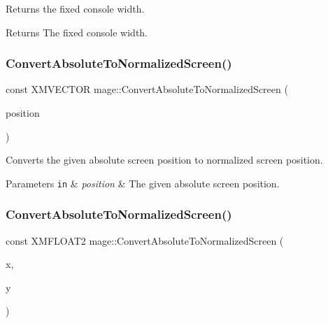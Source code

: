 Returns the fixed console width.

\begin{DoxyReturn}{Returns}
The fixed console width. 
\end{DoxyReturn}
\hypertarget{namespacemage_add9fc09b8a7166c5e0d0bde63d8f2747}{}\label{namespacemage_add9fc09b8a7166c5e0d0bde63d8f2747} 
\subsubsection{\texorpdfstring{Convert\+Absolute\+To\+Normalized\+Screen()}{ConvertAbsoluteToNormalizedScreen()}\hspace{0.1cm}{\footnotesize\ttfamily [1/3]}}
{\footnotesize\ttfamily const X\+M\+V\+E\+C\+T\+OR mage\+::\+Convert\+Absolute\+To\+Normalized\+Screen (\begin{DoxyParamCaption}\item[{const X\+M\+V\+E\+C\+T\+OR \&}]{position }\end{DoxyParamCaption})}

Converts the given absolute screen position to normalized screen position.


\begin{DoxyParams}[1]{Parameters}
\mbox{\tt in}  & {\em position} & The given absolute screen position. \\
\hline
\end{DoxyParams}
\hypertarget{namespacemage_a98a82c6ca513d50f16d4ee6256fdac29}{}\label{namespacemage_a98a82c6ca513d50f16d4ee6256fdac29} 
\subsubsection{\texorpdfstring{Convert\+Absolute\+To\+Normalized\+Screen()}{ConvertAbsoluteToNormalizedScreen()}\hspace{0.1cm}{\footnotesize\ttfamily [2/3]}}
{\footnotesize\ttfamily const X\+M\+F\+L\+O\+A\+T2 mage\+::\+Convert\+Absolute\+To\+Normalized\+Screen (\begin{DoxyParamCaption}\item[{float}]{x,  }\item[{float}]{y }\end{DoxyParamCaption})}

